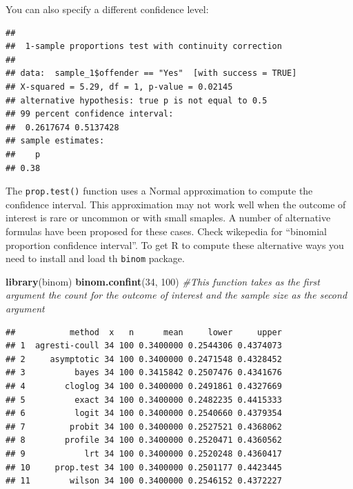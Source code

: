 \documentclass[]{book}
\newenvironment{Shaded}{\begin{snugshade}}{\end{snugshade}}
\newcommand{\CommentTok}[1]{\textcolor[rgb]{0.56,0.35,0.01}{\textit{#1}}}
\newcommand{\DataTypeTok}[1]{\textcolor[rgb]{0.13,0.29,0.53}{#1}}
\newcommand{\DecValTok}[1]{\textcolor[rgb]{0.00,0.00,0.81}{#1}}
\newcommand{\FloatTok}[1]{\textcolor[rgb]{0.00,0.00,0.81}{#1}}
\newcommand{\KeywordTok}[1]{\textcolor[rgb]{0.13,0.29,0.53}{\textbf{#1}}}
\newcommand{\NormalTok}[1]{#1}
\newcommand{\OperatorTok}[1]{\textcolor[rgb]{0.81,0.36,0.00}{\textbf{#1}}}
\newcommand{\StringTok}[1]{\textcolor[rgb]{0.31,0.60,0.02}{#1}}
\theoremstyle{definition}
\theoremstyle{definition}
\theoremstyle{definition}
\theoremstyle{remark}
\begin{document}
You can also specify a different confidence level:

\begin{Shaded}
\end{Shaded}

\begin{verbatim}
## 
##  1-sample proportions test with continuity correction
## 
## data:  sample_1$offender == "Yes"  [with success = TRUE]
## X-squared = 5.29, df = 1, p-value = 0.02145
## alternative hypothesis: true p is not equal to 0.5
## 99 percent confidence interval:
##  0.2617674 0.5137428
## sample estimates:
##    p 
## 0.38
\end{verbatim}

The \texttt{prop.test()} function uses a Normal approximation to compute
the confidence interval. This approximation may not work well when the
outcome of interest is rare or uncommon or with small smaples. A number
of alternative formulas have been proposed for these cases. Check
wikepedia for ``binomial proportion confidence interval''. To get R to
compute these alternative ways you need to install and load th
\texttt{binom} package.

\begin{Shaded}
\begin{Highlighting}[]
\KeywordTok{library}\NormalTok{(binom)}
\KeywordTok{binom.confint}\NormalTok{(}\DecValTok{34}\NormalTok{, }\DecValTok{100}\NormalTok{) }\CommentTok{#This function takes as the first argument the count for the outcome of interest and the sample size as the second argument}
\end{Highlighting}
\end{Shaded}

\begin{verbatim}
##           method  x   n      mean     lower     upper
## 1  agresti-coull 34 100 0.3400000 0.2544306 0.4374073
## 2     asymptotic 34 100 0.3400000 0.2471548 0.4328452
## 3          bayes 34 100 0.3415842 0.2507476 0.4341676
## 4        cloglog 34 100 0.3400000 0.2491861 0.4327669
## 5          exact 34 100 0.3400000 0.2482235 0.4415333
## 6          logit 34 100 0.3400000 0.2540660 0.4379354
## 7         probit 34 100 0.3400000 0.2527521 0.4368062
## 8        profile 34 100 0.3400000 0.2520471 0.4360562
## 9            lrt 34 100 0.3400000 0.2520248 0.4360417
## 10     prop.test 34 100 0.3400000 0.2501177 0.4423445
## 11        wilson 34 100 0.3400000 0.2546152 0.4372227
\end{verbatim}
\end{document}
